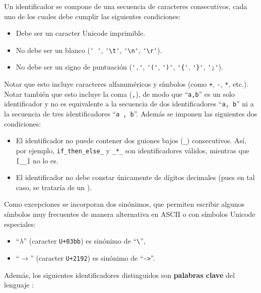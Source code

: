 
Un identificador se compone de una secuencia
de caracteres consecutivos,
cada uno de los cuales debe
cumplir las siguientes condiciones:
\begin{itemize}
\item Debe ser un caracter Unicode imprimible.
\item No debe ser un blanco
      (\verb|' '|, \verb|'\t'|,
       \verb|'\n'|, \verb|'\r'|).
\item No debe ser un signo de puntuación
      (\verb|'.'|, \verb|'('|, \verb|')'|,
      \verb|'{'|, \verb|'}'|, \verb|';'|).
\end{itemize}
Notar que esto incluye caracteres alfanuméricos
y símbolos (como \verb|+|, \verb|-|, \verb|*|, etc.).
Notar también que esto incluye la coma (\verb|,|),
de modo que ``\verb|a,b|'' es un solo identificador
y no es equivalente
a la secuencia de dos identificadores ``\verb|a, b|''
ni a la secuencia de tres identificadores ``\verb|a , b|''.
Además se imponen las siguientes dos condiciones:
\begin{itemize}
\item
  El identificador no puede contener dos
  guiones bajos (\verb|_|) consecutivos.
  Así, por ejemplo,
  \verb|if_then_else_| y \verb|_*_| son identificadores
  válidos, mientras que
  \verb|[__]| no lo es.
\item
  El identificador no debe constar
  únicamente de dígitos decimales
  (pues en tal caso, se trataría de un ).
\end{itemize}
Como excepciones se incorporan dos sinónimos, que permiten escribir
algunos símbolos muy frecuentes de manera alternativa en ASCII
o con símbolos Unicode especiales:
\begin{itemize}
\item ``$\lambda$'' (caracter \verb|U+03bb|) es sinónimo de ``\verb|\|'',
\item ``$\to$'' (caracter \verb|U+2192|) es sinónimo de ``\verb|->|''.
\end{itemize}
Además, los siguientes identificadores distinguidos son {\bf palabras clave}
del lenguaje \nuflo:

